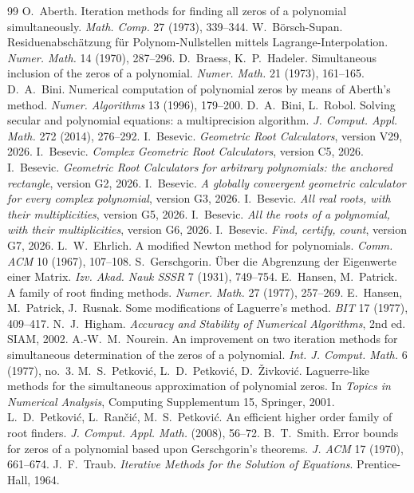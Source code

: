 \documentclass[10pt,a4paper]{article}
\theoremstyle{definition}
\numberwithin{equation}{section}
\begin{document}
\begin{thebibliography}{99}\small
{} O.~Aberth. Iteration methods for finding all zeros of a polynomial simultaneously.
 \emph{Math. Comp.} 27 (1973), 339--344.
 W.~B\"orsch-Supan. Residuenabsch\"atzung f\"ur Polynom-Nullstellen mittels
 Lagrange-Interpolation. \emph{Numer. Math.} 14 (1970), 287--296.
 D.~Braess, K.~P.~Hadeler. Simultaneous inclusion of the zeros of a polynomial.
 \emph{Numer. Math.} 21 (1973), 161--165.
 D.~A.~Bini. Numerical computation of polynomial zeros by means of Aberth's method.
 \emph{Numer. Algorithms} 13 (1996), 179--200.
 D.~A.~Bini, L.~Robol. Solving secular and polynomial equations: a multiprecision
 algorithm. \emph{J. Comput. Appl. Math.} 272 (2014), 276--292.
 I.~Besevic. \emph{Geometric Root Calculators}, version V29, 2026.
 I.~Besevic. \emph{Complex Geometric Root Calculators}, version C5, 2026.
 I.~Besevic. \emph{Geometric Root Calculators for arbitrary polynomials: the anchored
 rectangle}, version G2, 2026.
 I.~Besevic. \emph{A globally convergent geometric calculator for every complex
 polynomial}, version G3, 2026.
 I.~Besevic. \emph{All real roots, with their multiplicities}, version G5, 2026.
 I.~Besevic. \emph{All the roots of a polynomial, with their multiplicities}, version G6,
 2026.
 I.~Besevic. \emph{Find, certify, count}, version G7, 2026.
 L.~W.~Ehrlich. A modified Newton method for polynomials. \emph{Comm. ACM} 10 (1967),
 107--108.
 S.~Gerschgorin. \"Uber die Abgrenzung der Eigenwerte einer Matrix. \emph{Izv. Akad.
 Nauk SSSR} 7 (1931), 749--754.
 E.~Hansen, M.~Patrick. A family of root finding methods. \emph{Numer. Math.} 27 (1977),
 257--269.
 E.~Hansen, M.~Patrick, J.~Rusnak. Some modifications of Laguerre's method. \emph{BIT} 17
 (1977), 409--417.
 N.~J.~Higham. \emph{Accuracy and Stability of Numerical Algorithms}, 2nd ed. SIAM,
 2002.
 A.-W.~M.~Nourein. An improvement on two iteration methods for simultaneous
 determination of the zeros of a polynomial. \emph{Int. J. Comput. Math.} 6 (1977), no.~3.
 M.~S.~Petkovi\'c, L.~D.~Petkovi\'c, D.~\v{Z}ivkovi\'c. Laguerre-like methods for the
 simultaneous approximation of polynomial zeros. In \emph{Topics in Numerical Analysis}, Computing
 Supplementum 15, Springer, 2001.
 L.~D.~Petkovi\'c, L.~Ran\v{c}i\'c, M.~S.~Petkovi\'c. An efficient higher order family
 of root finders. \emph{J. Comput. Appl. Math.} (2008), 56--72.
 B.~T.~Smith. Error bounds for zeros of a polynomial based upon Gerschgorin's theorems.
 \emph{J. ACM} 17 (1970), 661--674.
 J.~F.~Traub. \emph{Iterative Methods for the Solution of Equations}. Prentice-Hall,
 1964.
\end{thebibliography}
\end{document}
